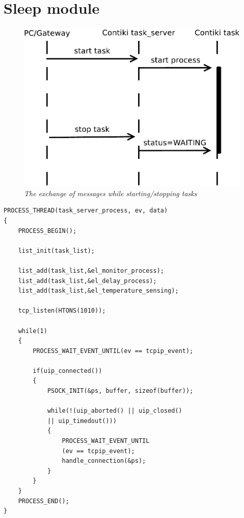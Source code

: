 \section{Sleep module}


\begin{figure}[ht]
	\begin{center}
		\includegraphics[scale=0.5]{img/starttask.pdf}
	\end{center}
	\caption{\small \itshape{The exchange of messages while starting/stopping tasks}}
\end{figure}

\lstset{numbers=left, mathescape=true, nolol=false,caption=Task server snippet,label=lst:taskserver}
\begin{lstlisting}
PROCESS_THREAD(task_server_process, ev, data)
{
	PROCESS_BEGIN();

	list_init(task_list);

	list_add(task_list,&el_monitor_process);
	list_add(task_list,&el_delay_process);
	list_add(task_list,&el_temperature_sensing);

	tcp_listen(HTONS(1010));

	while(1) 
	{
		PROCESS_WAIT_EVENT_UNTIL(ev == tcpip_event);

		if(uip_connected()) 
		{
			PSOCK_INIT(&ps, buffer, sizeof(buffer));

			while(!(uip_aborted() || uip_closed() 
			|| uip_timedout())) 
			{
				PROCESS_WAIT_EVENT_UNTIL
				(ev == tcpip_event);
				handle_connection(&ps);
			}
		}
	}
	PROCESS_END();
}
\end{lstlisting}

